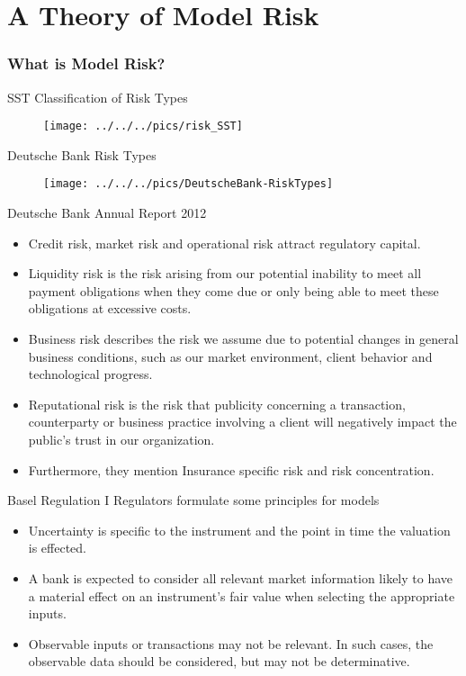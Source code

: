 
\part{A Theory of Model Risk}

\section{What is Model Risk?}



{SST Classification of Risk Types}
\begin{figure}
	\centering
		\texttt{[image: ../../../pics/risk\_SST]}
	\label{fig:Risk_map1}
\end{figure}



{Deutsche Bank Risk Types}
\begin{figure}
	\centering
		\texttt{[image: ../../../pics/DeutscheBank-RiskTypes]}
	\label{fig:Risk_map2}
\end{figure}


{Deutsche Bank Annual Report 2012}
\begin{itemize}
\item<1->
Credit risk, market risk and operational risk attract regulatory capital.
\item<2-> Liquidity risk is the risk arising from our potential inability to meet all payment obligations when they come due or only being able to meet these obligations at excessive costs.
\item<3->Business risk describes the risk we assume due to potential changes in general business conditions, such as our market environment, client behavior and technological progress.
\item<4->Reputational risk is the risk that publicity concerning a transaction, counterparty or business practice involving a client will negatively impact the public's trust in our organization.
\item<5->Furthermore, they mention Insurance specific risk and risk concentration.
\end{itemize}






{Basel Regulation I}
Regulators formulate some principles for models
\begin{itemize}
\item<1-> Uncertainty is specific to the instrument and the point in time the valuation is effected.
\item<2-> A bank is expected to consider all relevant market information likely to have a material effect on an instrument's fair value when selecting the appropriate inputs.
\item<3->Observable inputs or transactions may not be relevant. In such cases, the observable data should be considered, but   may not be determinative.
\end{itemize}


